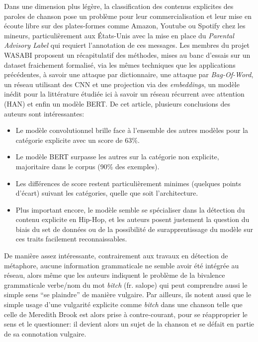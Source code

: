 Dans une dimension plus légère, la classification des contenus explicites des paroles de chanson pose un problème pour leur commercialisation et leur mise en écoute libre sur des plates-formes comme Amazon, Youtube ou Spotify chez les mineurs, particulièrement aux États-Unis avec la mise en place du \textit{Parental Advisory Label} qui requiert l'annotation de ces messages. Les membres du projet WASABI proposent un récapitulatif des méthodes, mises au banc d'essais sur un dataset fraichement formalisé, via les mêmes techniques que les applications précédentes, à savoir une attaque par dictionnaire, une attaque par \textit{Bag-Of-Word}, un réseau utilisant des CNN et une projection via des \textit{embeddings}, un modèle inédit pour la littérature étudiée ici à savoir un réseau récurrent avec attention (HAN) et enfin un modèle BERT. De cet article, plusieurs conclusions des auteurs sont intéressantes:
\begin{itemize}
    \item Le modèle convolutionnel brille face à l'ensemble des autres modèles pour la catégorie explicite avec un score de 63\%.
    \item Le modèle BERT surpasse les autres sur la catégorie non explicite, majoritaire dans le corpus (90\% des exemples).
    \item Les différences de score restent particulièrement minimes (quelques points d'écart) suivant les catégories, quelle que soit l'architecture.
    \item Plus important encore, le modèle semble se spécialiser dans la détection du contenu explicite en Hip-Hop, et les auteurs posent justement la question du biais du set de données ou de la possibilité de surapprentissage du modèle sur ces traits facilement reconnaissables.
\end{itemize}
De manière assez intéressante, contrairement aux travaux en détection de métaphore, aucune information grammaticale ne semble avoir été intégrée au réseau, alors même que les auteurs indiquent le problème de la bivalence grammaticale verbe/nom du mot \textit{bitch} (fr. salope) qui peut comprendre aussi le simple sens \enquote{se plaindre} de manière vulgaire. Par ailleurs, ils notent aussi que le simple usage d'une vulgarité explicite comme \textit{bitch} dans une chanson telle que celle de Meredith Brook est alors prise à contre-courant, pour se réapproprier le sens et le questionner: il devient alors un sujet de la chanson et se défait en partie de sa connotation vulgaire.

